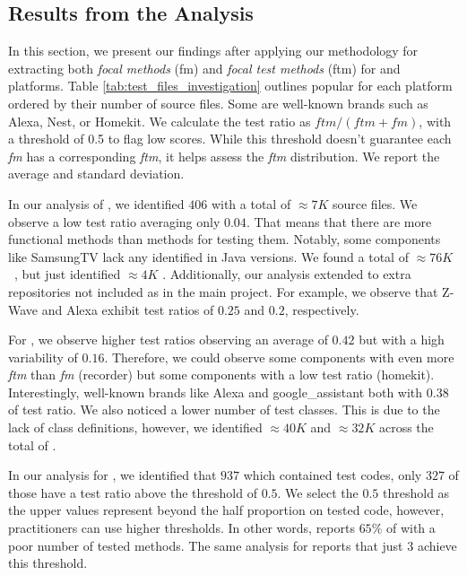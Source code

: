 \subsection{Results from the Analysis}
In this section, we present our findings after applying our methodology for extracting both \textit{focal methods} (fm)  and \textit{focal test methods} (ftm) for \openhab and \homeassistant platforms. Table \ref{tab:test_files_investigation} outlines popular \addons for each platform ordered by their number of source files. Some \addons are well-known brands such as Alexa\cite{alexa}, Nest\cite{nest}, or Homekit\cite{homekit}. We calculate the test ratio as $ftm / (ftm + fm)$, with a threshold of 0.5 to flag low scores. While this threshold doesn't guarantee each \textit{fm} has a corresponding \textit{ftm}, it helps assess the \textit{ftm} distribution. We report the average and standard deviation.



In our analysis of \openhab, we identified $406$ \addons with a total of $\approx7K$ source files. We observe a low test ratio averaging only $0.04$. That means that there are more functional methods than methods for testing them. Notably, some components like SamsungTV lack any identified \ftm in Java versions. We found a total of $\approx76K$\ \fm, but just identified $\approx4K$ \ftm. Additionally, our analysis extended to extra \openhab repositories not included as \addons in the main project. For example, we observe that Z-Wave and Alexa exhibit test ratios of $0.25$ and $0.2$, respectively.



For \homeassistant, we observe higher test ratios observing an average of $0.42$ but with a high variability of $0.16$. Therefore, we could observe some components with even more \textit{ftm} than \textit{fm} (\ie recorder) but some components with a low test ratio (\eg homekit). Interestingly, well-known brands like Alexa and google\_assistant both with $0.38$ of test ratio.  We also noticed a lower number of test classes. This is due to the lack of class definitions, however, we identified $\approx40K$ \fm and $\approx32K$ \ftm across the total of \addons. 

In our analysis for \homeassistant, we identified  that $937$ \addons which contained test codes, only $327$ of those have a test ratio above the threshold of $0.5$. We select the $0.5$ threshold as the upper values represent beyond the half proportion on tested code, however, practitioners can use higher thresholds. In other words, \homeassistant reports $65\%$ of \addons with a poor number of tested methods. The same analysis for \openhab reports that just 3 \addons achieve this threshold. 


